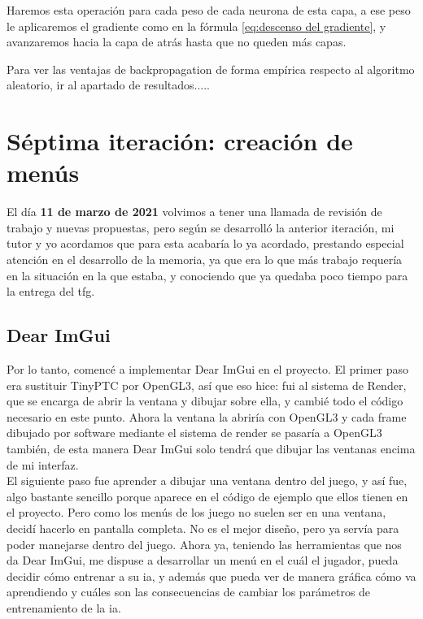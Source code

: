 Haremos esta operación para cada peso de cada neurona de esta capa, a ese peso le aplicaremos el gradiente como en la fórmula \ref{eq:descenso del gradiente}, y avanzaremos hacia la capa de atrás hasta que no queden más capas.

Para ver las ventajas de backpropagation de forma empírica respecto al algoritmo aleatorio, ir al apartado de resultados.....

\section{Séptima iteración: creación de menús}
El día \textbf{11 de marzo de 2021} volvimos a tener una llamada de revisión de trabajo y nuevas propuestas, pero según se desarrolló la anterior iteración, mi tutor y yo acordamos que para esta acabaría lo ya acordado, prestando especial atención en el desarrollo de la memoria, ya que era lo que más trabajo requería en la situación en la que estaba, y conociendo que ya quedaba poco tiempo para la entrega del \gls{tfg}.

\subsection{Dear ImGui}
Por lo tanto, comencé a implementar Dear ImGui en el proyecto. El primer paso era sustituir TinyPTC por OpenGL3, así que eso hice: fui al sistema de Render, que se encarga de abrir la ventana y dibujar sobre ella, y cambié todo el código necesario en este punto. Ahora la ventana la abriría con OpenGL3 y cada frame dibujado por software mediante el sistema de render se pasaría a OpenGL3 también, de esta manera Dear ImGui solo tendrá que dibujar las ventanas encima de mi interfaz.
\\
El siguiente paso fue aprender a dibujar una ventana dentro del juego, y así fue, algo bastante sencillo porque aparece en el código de ejemplo que ellos tienen en el proyecto.
Pero como los menús de los juego no suelen ser en una ventana, decidí hacerlo en pantalla completa. No es el mejor diseño, pero ya servía para poder manejarse  dentro del juego.
Ahora ya, teniendo las herramientas que nos da Dear ImGui, me dispuse a desarrollar un menú en el cuál el jugador, pueda decidir cómo entrenar a su \gls{ia}, y además que pueda ver de manera gráfica cómo va aprendiendo y cuáles son las consecuencias de cambiar los parámetros de entrenamiento de la \gls{ia}.

